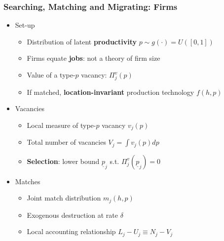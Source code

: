 \documentclass{beamer}
\newcommand{\1}{\mathbb{1}}
\newcommand{\up}{\underline{p}}
\begin{document}
\begin{frame}\frametitle{Searching, Matching and Migrating: Firms}
\vspace{-0.3cm}
\begin{itemize}
\item Set-up
\begin{itemize}
\item Distribution of latent \textbf{productivity} $p\sim g(\cdot)=U([0,1])$
\item Firms equate \textbf{jobs}: not a theory of firm size
\item Value of a type-$p$ vacancy: $\Pi_j^v(p)$
\item If matched, \textbf{location-invariant} production technology $f(h,p)$%
\end{itemize}\medskip
\item Vacancies
\begin{itemize}
\item Local measure of type-$p$ vacancy $v_j(p)$
\item Total number of vacancies $V_j=\int v_j(p)dp$
\item \textbf{Selection}: lower bound $\up_j$ s.t. $\Pi_j^v(\up_j)=0$
\end{itemize}\medskip
\item Matches
\begin{itemize}
\item Joint match distribution $m_j(h,p)$
\item Exogenous destruction at rate $\delta$
\item Local accounting relationship $L_j-U_j\equiv N_j-V_j$
\end{itemize}
\end{itemize}
\end{frame}
\end{document}
